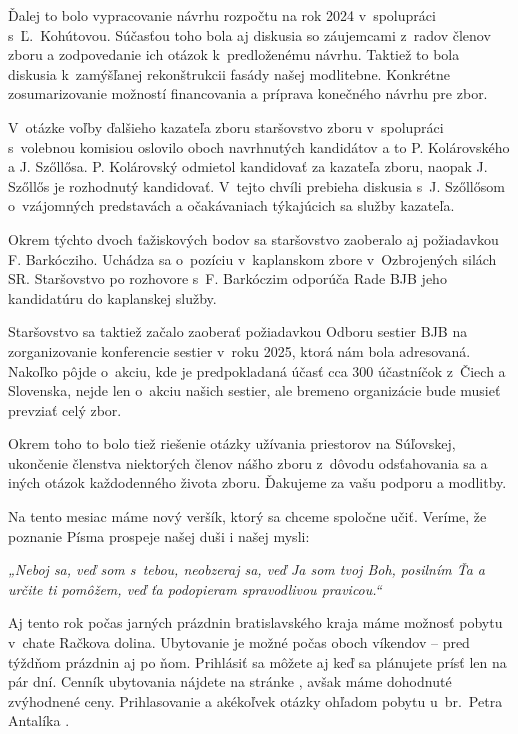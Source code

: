 Ďalej to bolo vypracovanie návrhu rozpočtu na rok 2024 v~spolupráci s~Ľ.~Kohútovou. Súčasťou toho bola aj diskusia so záujemcami z~radov členov zboru a zodpovedanie ich otázok k~predloženému návrhu. Taktiež to bola diskusia k~zamýšľanej rekonštrukcii fasády našej modlitebne. Konkrétne zosumarizovanie možností financovania a príprava konečného návrhu pre zbor.

V~otázke voľby ďalšieho kazateľa zboru staršovstvo zboru v~spolupráci s~volebnou komisiou oslovilo oboch navrhnutých kandidátov a to P. Kolárovského a J. Szőllősa. P. Kolárovský odmietol kandidovať za kazateľa zboru, naopak J. Szőllős je rozhodnutý kandidovať. V~tejto chvíli prebieha diskusia s~J. Szőllősom o~vzájomných predstavách a očakávaniach týkajúcich sa služby kazateľa.

Okrem týchto dvoch ťažiskových bodov sa staršovstvo zaoberalo aj požiadavkou F. Barkócziho. Uchádza sa o~pozíciu v~kaplanskom zbore v~Ozbrojených silách SR. Staršovstvo po rozhovore s~F. Barkóczim odporúča Rade BJB jeho kandidatúru do kaplanskej služby.

Staršovstvo sa taktiež začalo zaoberať požiadavkou Odboru sestier BJB na zorganizovanie konferencie sestier v~roku 2025, ktorá nám bola adresovaná. Nakoľko pôjde o~akciu, kde je predpokladaná účasť cca 300 účastníčok z~Čiech a Slovenska, nejde len o~akciu našich sestier, ale bremeno organizácie bude musieť prevziať celý zbor.

Okrem toho to bolo tiež riešenie otázky užívania priestorov na Súľovskej, ukončenie členstva niektorých členov nášho zboru z~dôvodu odsťahovania sa a iných otázok každodenného života zboru.
Ďakujeme za vašu podporu a modlitby.




Na tento mesiac máme nový veršík, ktorý sa chceme spoločne učiť. Veríme, že poznanie Písma prospeje našej duši i našej mysli:

{\it „Neboj sa, veď som s~tebou, neobzeraj sa, veď Ja som tvoj Boh, posilním Ťa a určite ti pomôžem, veď ťa podopieram spravodlivou pravicou.“}




Aj tento rok počas jarných prázdnin bratislavského kraja máme možnosť pobytu v~chate Račkova dolina. Ubytovanie je možné počas oboch víkendov -- pred týždňom prázdnin aj po ňom. Prihlásiť sa môžete aj keď sa plánujete prísť len na pár dní. Cenník ubytovania nájdete na stránke , avšak máme dohodnuté zvýhodnené ceny. Prihlasovanie a akékoľvek otázky ohľadom pobytu u~br.~Petra Antalíka .


